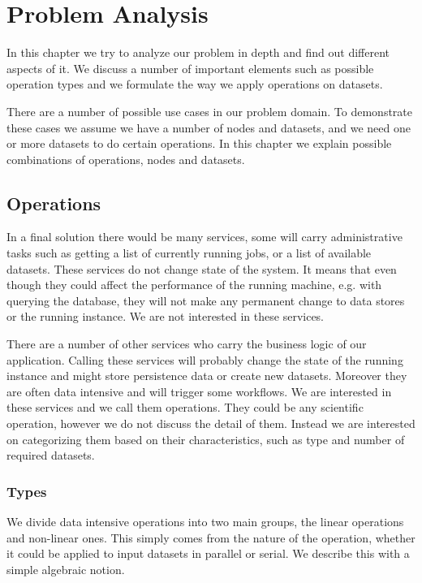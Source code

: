 \chapter{Problem Analysis}
\label{cha:analysis}

In this chapter we try to analyze our problem in depth and find out different aspects of it. We 
discuss a number of important elements such as possible operation types and we formulate the way
we apply operations on datasets.

There are a number of possible use cases in our problem domain. To demonstrate these cases we assume
we have a number of nodes and datasets, and we need one or more datasets to do certain operations.
In this chapter we explain possible combinations of operations, nodes and datasets.

\section{Operations}
In a final solution there would be many services, some will carry administrative tasks such as
getting a list of currently running jobs, or a list of available datasets. These services do not
change state of the system. It means that even though they could affect the performance of the 
running machine, e.g. with querying the database, they will not make any permanent change to 
data stores or the running instance. We are not interested in these services.

There are a number of other services who carry the business logic of our application. Calling
these services will probably change the state of the running instance and might store persistence
data or create new datasets. Moreover they are often data intensive and will trigger some workflows.
 We are interested in these services and we call them operations. They could be
any scientific operation, however we do not discuss the detail of them. Instead we are interested on
categorizing them based on their characteristics, such as type and number of required datasets.
\subsection{Types}
We divide data intensive operations into two main groups, the linear operations and non-linear ones.
This simply comes from the nature of the operation, whether it could be applied to input datasets
in parallel or serial. We describe this with a simple algebraic notion.

